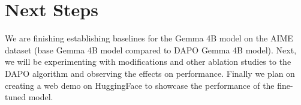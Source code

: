 \documentclass[11pt, oneside]{article}   	%
\begin{document}
\section*{Next Steps}

We are finishing establishing baselines for the Gemma 4B model on the AIME dataset (base Gemma 4B model compared to DAPO Gemma 4B model). Next, we will be experimenting with modifications and other ablation studies to the DAPO algorithm and observing the effects on performance. Finally we plan on creating a web demo on HuggingFace to showcase the performance of the fine-tuned model.

\printbibliography
\end{document}
